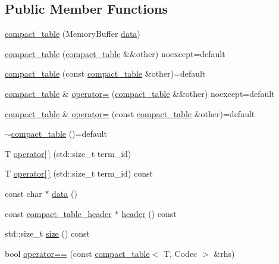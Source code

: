 \subsection*{Public Member Functions}
\begin{DoxyCompactItemize}
\item 
\mbox{\hyperlink{classirk_1_1compact__table_a7837dc73daa2b72450bca208a4a315bb}{compact\+\_\+table}} (Memory\+Buffer \mbox{\hyperlink{classirk_1_1compact__table_a6e52197052d12372b72d568ce9df384f}{data}})
\item 
\mbox{\hyperlink{classirk_1_1compact__table_ad80e786ec31ff54df435b3910c6c77e1}{compact\+\_\+table}} (\mbox{\hyperlink{classirk_1_1compact__table}{compact\+\_\+table}} \&\&other) noexcept=default
\item 
\mbox{\hyperlink{classirk_1_1compact__table_a2f9719d8fda6a5db0aa3ea089a2b1274}{compact\+\_\+table}} (const \mbox{\hyperlink{classirk_1_1compact__table}{compact\+\_\+table}} \&other)=default
\item 
\mbox{\hyperlink{classirk_1_1compact__table}{compact\+\_\+table}} \& \mbox{\hyperlink{classirk_1_1compact__table_a94d21b314eaaeb1e874b652aab4e3c57}{operator=}} (\mbox{\hyperlink{classirk_1_1compact__table}{compact\+\_\+table}} \&\&other) noexcept=default
\item 
\mbox{\hyperlink{classirk_1_1compact__table}{compact\+\_\+table}} \& \mbox{\hyperlink{classirk_1_1compact__table_a932785c03aaa201464a86435f8f8d23f}{operator=}} (const \mbox{\hyperlink{classirk_1_1compact__table}{compact\+\_\+table}} \&other)=default
\item 
\mbox{\hyperlink{classirk_1_1compact__table_afd085e91ac574633aaba9e3f606fbe59}{$\sim$compact\+\_\+table}} ()=default
\item 
T \mbox{\hyperlink{classirk_1_1compact__table_acdcdce1447487c4ab98dbe370b6e394f}{operator\mbox{[}$\,$\mbox{]}}} (std\+::size\+\_\+t term\+\_\+id)
\item 
T \mbox{\hyperlink{classirk_1_1compact__table_a9ecc7e062cbf50ef02db7740c166fb94}{operator\mbox{[}$\,$\mbox{]}}} (std\+::size\+\_\+t term\+\_\+id) const
\item 
const char $\ast$ \mbox{\hyperlink{classirk_1_1compact__table_a6e52197052d12372b72d568ce9df384f}{data}} ()
\item 
const \mbox{\hyperlink{structirk_1_1compact__table__header}{compact\+\_\+table\+\_\+header}} $\ast$ \mbox{\hyperlink{classirk_1_1compact__table_a71a7a452bf75a037e9bf22e231124a5e}{header}} () const
\item 
std\+::size\+\_\+t \mbox{\hyperlink{classirk_1_1compact__table_a868e5c254b459b6ab831681d5e9f34c1}{size}} () const
\item 
bool \mbox{\hyperlink{classirk_1_1compact__table_ab0fbc092d98001d97e8ec78e24f4040d}{operator==}} (const \mbox{\hyperlink{classirk_1_1compact__table}{compact\+\_\+table}}$<$ T, Codec $>$ \&rhs)
\end{DoxyCompactItemize}
